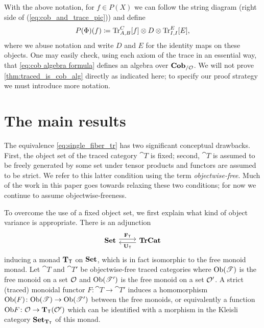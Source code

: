 \documentclass[11pt,oneside,article]{memoir}
\begin{document}
With the above notation, for $f\in P(X)$ we can follow the string diagram (right side of
(\ref{eq:cob_and_trace_pic})) and define
\begin{equation}
    \label{eq:cob algebra formula}
  P(\Phi)(f)\coloneqq\operatorname{Tr}_{A,B}^C[f]\otimes D\otimes\operatorname{Tr}^E_{I,I}[E],
\end{equation}
where we abuse notation and write $D$ and $E$ for the identity maps on these objects. One may easily
check, using each axiom of the trace \cite{JoyalStreetVerity} in an essential way, that
\eqref{eq:cob algebra formula} defines an algebra over $\mathbf{Cob}_{/\mathcal{O}}$. We will not prove
\ref{thm:traced_is_cob_alg} directly as indicated here; to specify our proof strategy we must
introduce more notation.

\section{The main results}
  \label{sec:main_results}

The equivalence \eqref{eq:single_fiber_tr} has two significant conceptual drawbacks. First, the object set
of the traced category $\cat{T}$ is fixed; second, $\cat{T}$ is assumed to be freely generated by some set under tensor
products and functors are assumed to be strict. We refer to this latter condition using the term
\emph{objectwise-free}. Much of the work in this paper goes towards relaxing these two conditions; for now we continue to assume objectwise-freeness. 

To overcome the use of a fixed object set, we first explain what kind of object variance is
appropriate. There is an adjunction
\begin{equation}\label{eqn:FT_UT}
  \Adjoint{\Set}{\TrCat}{\FT}{\UT}
\end{equation}
inducing a monad $\mathbf{T}_{\mathsf{T}}$ on $\mathbf{Set}$, which is in fact isomorphic to the free monoid monad. Let
$\cat{T}$ and $\cat{T}'$ be objectwise-free traced categories where $\mathrm{Ob}(\mathscr{T})$ is the free
monoid on a set $\mathcal{O}$ and $\mathrm{Ob}(\mathscr{T}')$ is the free monoid on a set $\mathcal{O}'$. A strict
(traced) monoidal functor $F\colon \cat{T}\to \cat{T}'$ induces a homomorphism
$\mathrm{Ob}(F)\colon\mathrm{Ob}(\mathscr{T})\to\mathrm{Ob}(\mathscr{T}')$ between the free monoids, or equivalently a function $\mathrm{Ob}
F\colon\mathcal{O}\to\mathbf{T}_{\mathsf{T}}(\mathcal{O}')$ which can be identified with a morphism in the Kleisli category
$\mathbf{Set}_{\mathbf{T}_{\mathsf{T}}}$ of this monad.
\end{document}
